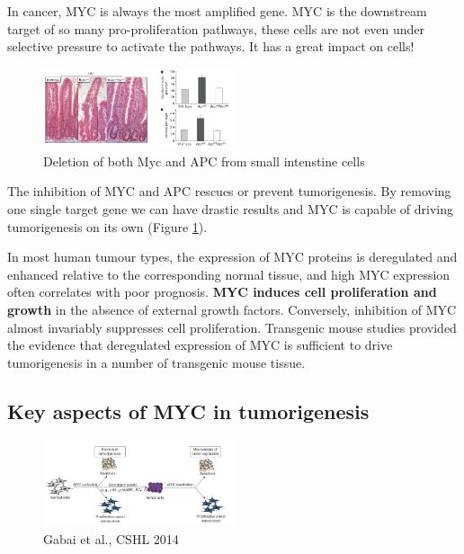 In cancer, MYC is always the most amplified gene. MYC is the downstream target of so many pro-proliferation pathways, these cells are not even under selective pressure to activate the pathways.
It has a great impact on cells!

\begin{figure}
\centering
\includegraphics[width=0.5\textwidth]{../_resources/641af477cb65d73954e1ae24aab9a2ed.png}
\caption{Deletion of both Myc and APC from small intenstine cells}
\label{fig:inhi}
\end{figure}

The inhibition of MYC and APC rescues or prevent tumorigenesis. By removing one single target gene we can have drastic results and MYC is capable of driving tumorigenesis on its own (Figure \ref{fig:inhi}).

In most human tumour types, the expression of MYC proteins is deregulated and enhanced relative to the corresponding normal tissue, and high MYC expression often correlates with poor prognosis. \textbf{MYC induces cell proliferation and growth} in the absence of external growth factors. Conversely, inhibition of MYC almost invariably suppresses cell proliferation.
Transgenic mouse studies provided the evidence that deregulated expression of MYC is sufficient to drive tumorigenesis in a number of transgenic mouse tissue.

\hypertarget{key-aspect-of-myc-in-tumorigenesis}{%
\subsection{Key aspects of MYC in tumorigenesis}\label{key-aspect-of-myc-in-tumorigenesis}}

\begin{figure}
\centering
\includegraphics[width=0.5\textwidth]{../_resources/18345a0e70ca9e50883ca61f93ad3405.png}
\caption{Gabai et al., CSHL 2014}
\label{fig:key}
\end{figure}

